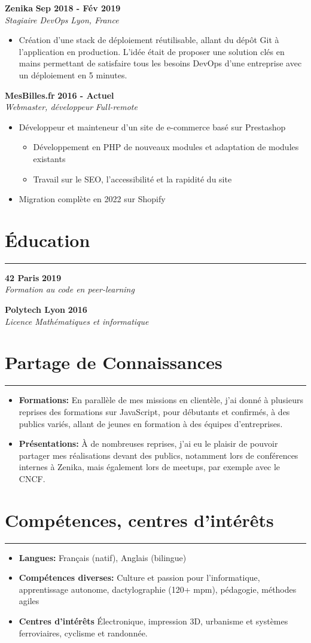 \documentclass[11pt]{article}
\newcommand{\experience}[4]{%
  \vspace{5pt}
  \textbf{#2} \hfill \textbf{#3} \\
  \textit{#1} \hfill \textit{#4} \\
  \vspace{-10pt}
}
\newcommand{\cvsection}[1]{%
  \section*{#1}
    \vspace{-10pt}
    \hrule
    \vspace{10pt}
}
\begin{document}
\experience{Stagiaire DevOps}{Zenika}{Sep 2018 - Fév 2019}{Lyon, France}
\vspace{-10pt}
\begin{itemize}
  \item Création d'une stack de déploiement réutilisable, allant du dépôt Git à l'application en production. L'idée était de proposer une solution clés en mains permettant de satisfaire tous les besoins DevOps d'une entreprise avec un déploiement en 5 minutes.
\end{itemize}

\experience{Webmaster, développeur}{MesBilles.fr}{2016 - Actuel}{Full-remote}
\vspace{-10pt}
\begin{itemize}
    \item Développeur et mainteneur d'un site de e-commerce basé sur Prestashop
    \begin{itemize}
      \item Développement en PHP de nouveaux modules et adaptation de modules existants
      \item Travail sur le SEO, l'accessibilité et la rapidité du site
    \end{itemize}
    \item Migration complète en 2022 sur Shopify
\end{itemize}

\cvsection{Éducation}

\experience{Formation au code en peer-learning}{42 Paris}{2019}{}

\experience{Licence Mathématiques et informatique}{Polytech Lyon}{2016}{}

\cvsection{Partage de Connaissances}

\begin{itemize}
    \item \textbf{Formations:} En parallèle de mes missions en clientèle, j'ai donné à plusieurs reprises des formations sur JavaScript, pour débutants et confirmés, à des publics variés, allant de jeunes en formation à des équipes d'entreprises.
    \item \textbf{Présentations:} À de nombreuses reprises, j'ai eu le plaisir de pouvoir partager mes réalisations devant des publics, notamment lors de conférences internes à Zenika, mais également lors de meetups, par exemple avec le CNCF.
\end{itemize}



\cvsection{Compétences, centres d'intérêts}

\begin{itemize}
  \item \textbf{Langues:} Français (natif), Anglais (bilingue)
  \item \textbf{Compétences diverses:} Culture et passion pour l'informatique, apprentissage autonome, dactylographie (120+ mpm), pédagogie, méthodes agiles
  \item \textbf{Centres d'intérêts} Électronique, impression 3D, urbanisme et systèmes ferroviaires, cyclisme et randonnée.
\end{itemize}
\end{document}
